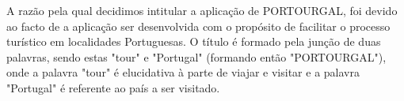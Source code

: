 A razão pela qual decidimos intitular a aplicação de PORTOURGAL, foi devido ao facto de a aplicação ser desenvolvida com o propósito de facilitar o processo turístico em localidades Portuguesas. O título é formado pela junção de duas palavras, sendo estas "tour" e "Portugal" (formando então "PORTOURGAL"), onde a palavra "tour" é elucidativa à parte de viajar e visitar e a palavra "Portugal" é referente ao país a ser visitado.